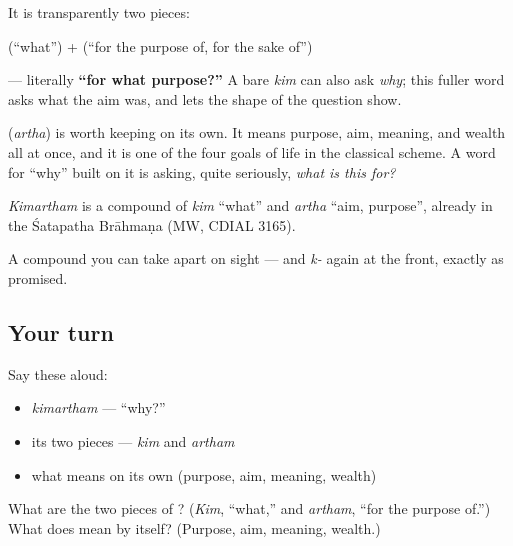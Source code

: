 It is transparently two pieces:

\emph{} (\textquotedblleft{}what\textquotedblright{}) + \emph{} (\textquotedblleft{}for the purpose of, for the sake of\textquotedblright{})

— literally \textbf{\textquotedblleft{}for what purpose?\textquotedblright{}} A bare \emph{kim} can also ask \emph{why}; this fuller word asks what the aim was, and lets the shape of the question show.

\emph{} (\emph{artha}) is worth keeping on its own. It means purpose, aim, meaning, and wealth all at once, and it is one of the four goals of life in the classical scheme. A word for \textquotedblleft{}why\textquotedblright{} built on it is asking, quite seriously, \emph{what is this for?}

\begin{cousinweb}
\emph{Kimartham} is a compound of \emph{kim} \textquotedblleft{}what\textquotedblright{} and \emph{artha} \textquotedblleft{}aim, purpose\textquotedblright{}, already in the Śatapatha Brāhmaṇa (MW, CDIAL 3165).
\end{cousinweb}

\begin{grammarlens}[title={What you've built}]
A compound you can take apart on sight — and \emph{k-} again at the front, exactly as promised.
\end{grammarlens}

\subsection*{Your turn}
Say these aloud:

\begin{itemize}
\raggedright
  \item \emph{kimartham} — \textquotedblleft{}why?\textquotedblright{}
  \item its two pieces — \emph{kim} and \emph{artham}
  \item what  means on its own (purpose, aim, meaning, wealth)
\end{itemize}

\begin{tcolorbox}[breakable,colback=teal!4,colframe=teal!35!black,title={Before you move on}]
What are the two pieces of ? (\emph{Kim}, \textquotedblleft{}what,\textquotedblright{} and \emph{artham}, \textquotedblleft{}for the purpose of.\textquotedblright{}) What does  mean by itself? (Purpose, aim, meaning, wealth.)
\end{tcolorbox}
